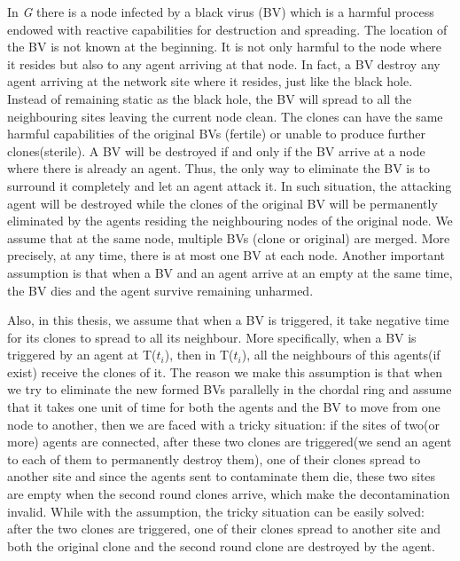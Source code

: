 In {\em G} there is a node infected by a black virus (BV) which is a harmful process endowed with reactive capabilities for destruction and spreading. The location of the BV is not known at the beginning. It is not only harmful to the node where it resides but also to any agent arriving at that node. In fact, a BV destroy any agent arriving at the network site where it resides, just like the black hole. Instead of remaining static as the black hole, the BV will spread to all the neighbouring sites leaving the current node clean. The clones can have the same harmful capabilities of the original BVs (fertile) or unable to produce further clones(sterile). A BV will be destroyed if and only if the BV arrive at a node where there is already an agent. Thus, the only way to eliminate the BV is to surround it completely and let an agent attack it. In such situation, the attacking agent will be destroyed while the clones of the original BV will be permanently eliminated by the agents residing the neighbouring nodes of the original node. We assume that at the same node, multiple BVs (clone or original) are merged. More precisely, at any time, there is at most one BV at each node. 
Another important assumption is that when a BV and an agent arrive at an empty at the same time, the BV dies and the agent survive remaining unharmed.

Also, in this thesis, we assume that when a BV is triggered, it take negative time for its clones to spread to all its neighbour. More specifically, when a BV is triggered by an agent at T($t_i$), then in T($t_i$), all the neighbours of this agents(if exist) receive the clones of it. The reason we make this assumption is that when we try to eliminate the new formed BVs parallelly in the chordal ring and assume that it takes one unit of time for both the agents and the BV to move from one node to another, then we are faced with a tricky situation: if the sites of two(or more) agents are connected, after these two clones are triggered(we send an agent to each of them to permanently destroy them), one of their clones spread to another site and since the agents sent to contaminate them die, these two sites are empty when the second round clones arrive, which make the decontamination invalid.
While with the assumption, the tricky situation can be easily solved: after the two clones are triggered, one of their clones spread to another site and both the original clone and the second round clone are destroyed by the agent.




